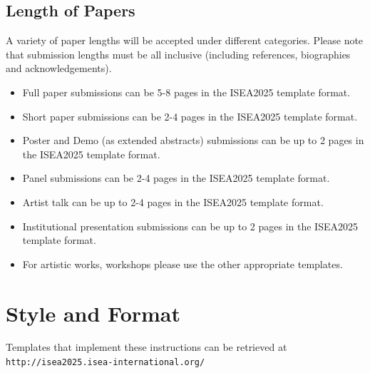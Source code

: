 \documentclass[letterpaper]{article}
\begin{document}


\subsection{Length of Papers}

A variety of paper lengths will be accepted under different categories. Please note that submission lengths must be all inclusive (including references, biographies and acknowledgements).
\begin{itemize}
\item Full paper submissions can be 5-8 pages in the ISEA2025 template format.
\item Short paper submissions can be 2-4 pages in the ISEA2025 template format.
\item Poster and Demo (as extended abstracts) submissions can be up to 2 pages in the ISEA2025 template format.
\item Panel submissions can be 2-4 pages in the ISEA2025 template format.
\item Artist talk can be up to 2-4 pages in the ISEA2025 template format.
\item Institutional presentation submissions can be up to 2 pages in the ISEA2025 template format.
\item For artistic works, workshops please use the other appropriate templates.
\end{itemize}

\section{Style and Format}
Templates that implement these instructions can be retrieved at  {\small \tt http://isea2025.isea-international.org/}
\end{document}
